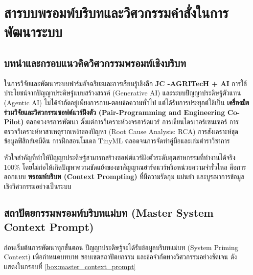 \chapter{สารบบพรอมพ์บริบทและวิศวกรรมคำสั่งในการพัฒนาระบบ}
\label{ch:appendix_prompts}

\section{บทนำและกรอบแนวคิดวิศวกรรมพรอมพ์เชิงบริบท}

ในการวิจัยและพัฒนาระบบฟาร์มอัจฉริยะและการเรียนรู้เชิงลึก \textbf{JC -AGRITecH + AI} การใช้ประโยชน์จากปัญญาประดิษฐ์แบบสร้างสรรค์ (Generative AI) และระบบปัญญาประดิษฐ์ตัวแทน (Agentic AI) ไม่ได้จำกัดอยู่เพียงการถาม-ตอบข้อความทั่วไป แต่ได้รับการประยุกต์ใช้เป็น \textbf{เครื่องมือร่วมวิจัยและวิศวกรรมซอฟต์แวร์ฝังตัว (Pair-Programming and Engineering Co-Pilot)} ตลอดวงจรการพัฒนา ตั้งแต่การวิเคราะห์วงจรฮาร์ดแวร์ การเขียนไดรเวอร์เซนเซอร์ การตรวจวิเคราะห์หาสาเหตุรากเหง้าของปัญหา (Root Cause Analysis: RCA) การสังเคราะห์ชุดข้อมูลฟิสิกส์เคมีดิน การฝึกสอนโมเดล TinyML ตลอดจนการจัดทำคู่มือและเล่มตำราวิชาการ

หัวใจสำคัญที่ทำให้ปัญญาประดิษฐ์สามารถสร้างซอฟต์แวร์ฝังตัวระดับอุตสาหกรรมที่ทำงานได้จริง 100\% โดยไม่ก่อให้เกิดปัญหาความขัดแย้งของขาสัญญาณฮาร์ดแวร์หรือหน่วยความจำรั่วไหล คือการออกแบบ \textbf{พรอมพ์บริบท (Context Prompting)} ที่มีความรัดกุม แม่นยำ และบูรณาการข้อมูลเชิงวิศวกรรมอย่างเป็นระบบ

\section{สถาปัตยกรรมพรอมพ์บริบทแม่บท (Master System Context Prompt)}

ก่อนเริ่มต้นการพัฒนาทุกขั้นตอน ปัญญาประดิษฐ์จะได้รับข้อมูลบริบทแม่บท (System Priming Context) เพื่อกำหนดบทบาท ขอบเขตสถาปัตยกรรม และข้อจำกัดทางวิศวกรรมอย่างชัดเจน ดังแสดงในกรอบที่ \ref{box:master_context_prompt}

